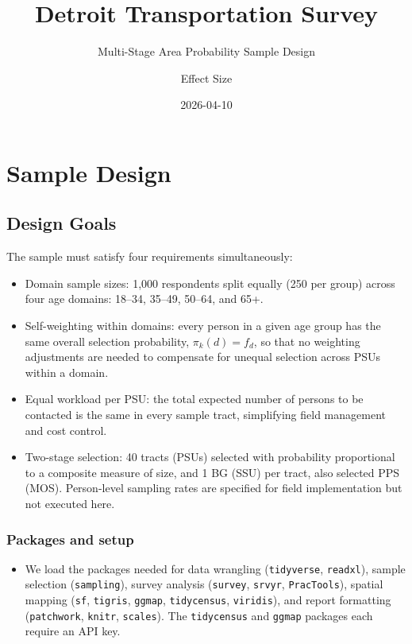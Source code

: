 \documentclass[
  11pt,
]{article}
\title{Detroit Transportation Survey}
\subtitle{Multi-Stage Area Probability Sample Design}
\author{Effect Size}
\date{2026-04-10}
\providecommand{\tightlist}{%
  \setlength{\itemsep}{0pt}\setlength{\parskip}{0pt}}\usepackage{longtable,booktabs,array}
\begin{document}
\maketitle


\section{Sample Design}\label{sec-design}

\subsection{Design Goals}\label{design-goals}

The sample must satisfy four requirements simultaneously:

\begin{itemize}
\tightlist
\item
  Domain sample sizes: 1,000 respondents split equally (250 per group)
  across four age domains: 18--34, 35--49, 50--64, and 65+.
\item
  Self-weighting within domains: every person in a given age group has
  the same overall selection probability, \(\pi_k(d) = f_d\), so that no
  weighting adjustments are needed to compensate for unequal selection
  across PSUs within a domain.
\item
  Equal workload per PSU: the total expected number of persons to be
  contacted is the same in every sample tract, simplifying field
  management and cost control.
\item
  Two-stage selection: 40 tracts (PSUs) selected with probability
  proportional to a composite measure of size, and 1 BG (SSU) per tract,
  also selected PPS (MOS). Person-level sampling rates are specified for
  field implementation but not executed here.
\end{itemize}

\subsubsection{Packages and setup}\label{packages-and-setup}

\begin{itemize}
\tightlist
\item
  We load the packages needed for data wrangling (\texttt{tidyverse},
  \texttt{readxl}), sample selection (\texttt{sampling}), survey
  analysis (\texttt{survey}, \texttt{srvyr}, \texttt{PracTools}),
  spatial mapping (\texttt{sf}, \texttt{tigris}, \texttt{ggmap},
  \texttt{tidycensus}, \texttt{viridis}), and report formatting
  (\texttt{patchwork}, \texttt{knitr}, \texttt{scales}). The
  \texttt{tidycensus} and \texttt{ggmap} packages each require an API
  key.
\end{itemize}
\end{document}
